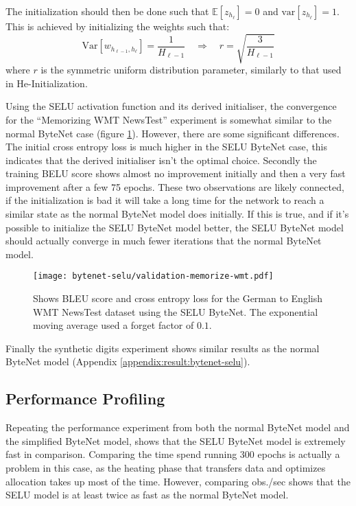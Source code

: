 
The initialization should then be done such that $\mathbb{E}[z_{h_\ell}] = 0$ and $\mathrm{var}[z_{h_\ell}] = 1$. This is achieved by initializing the weights such that:
\begin{equation}
\mathrm{Var}[w_{h_{\ell-1}, h_{\ell}}] = \frac{1}{H_{\ell-1}} \quad \Rightarrow \quad r = \sqrt{\frac{3}{H_{\ell-1}}}
\end{equation}
where $r$ is the symmetric uniform distribution parameter, similarly to that used in He-Initialization.

Using the SELU activation function and its derived initialiser, the convergence for the ``Memorizing WMT NewsTest'' experiment is somewhat similar to the normal ByteNet case (figure \ref{fig:result:selu-bytenet:bytenet-selu-wmt}). However, there are some significant differences. The initial cross entropy loss is much higher in the SELU ByteNet case, this indicates that the derived initialiser isn't the optimal choice. Secondly the training BELU score shows almost no improvement initially and then a very fast improvement after a few 75 epochs. These two observations are likely connected, if the initialization is bad it will take a long time for the network to reach a similar state as the normal ByteNet model does initially. If this is true, and if it's possible to initialize the SELU ByteNet model better, the SELU ByteNet model should actually converge in much fewer iterations that the normal ByteNet model.

\begin{figure}[h]
    \centering
    \texttt{[image: bytenet-selu/validation-memorize-wmt.pdf]}
    \caption{Shows BLEU score and cross entropy loss for the German to English WMT NewsTest dataset using the SELU ByteNet. The exponential moving average used a forget factor of $0.1$.}
    \label{fig:result:selu-bytenet:bytenet-selu-wmt}
\end{figure}

Finally the synthetic digits experiment shows similar results as the normal ByteNet model (Appendix \ref{appendix:result:bytenet-selu}).

\clearpage
\subsection{Performance Profiling}

Repeating the performance experiment from both the normal ByteNet model and the simplified ByteNet model, shows that the SELU ByteNet model is extremely fast in comparison. Comparing the time spend running 300 epochs is actually a problem in this case, as the heating phase that transfers data and optimizes allocation takes up most of the time. However, comparing obs./sec shows that the SELU model is at least twice as fast as the normal ByteNet model.

